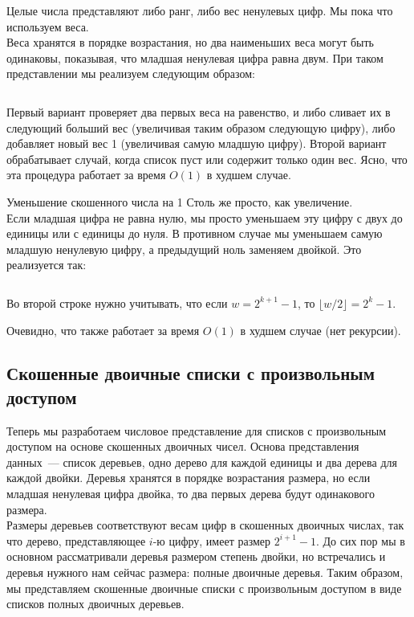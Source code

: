 \begin{frame}[fragile]{}
\inputminted[firstline=3,lastline=3]{haskell}{code/SkewNumbers.hs}
Целые числа представляют либо ранг, либо вес ненулевых цифр. Мы пока
что используем веса. \\

Веса хранятся в порядке возрастания, но два
наименьших веса могут быть одинаковы, показывая, что младшая ненулевая
цифра равна двум. При таком представлении мы реализуем 
следующим образом:
\inputminted[firstline=5,lastline=6]{haskell}{code/SkewNumbers.hs}

Первый вариант проверяет два первых веса на равенство, и либо сливает
их в следующий больший вес (увеличивая таким образом следующую цифру),
либо добавляет новый вес 1 (увеличивая самую младшую цифру). Второй
вариант обрабатывает случай, когда список  пуст или
содержит только один вес. Ясно, что эта процедура работает за время
$O(1)$ в худшем случае.
\end{frame}

\begin{frame}[fragile]{Уменьшение скошенного числа на 1}
Столь же просто, как
увеличение. \\

Если младшая цифра не равна нулю, мы просто уменьшаем эту
цифру с двух до единицы или с единицы до нуля. В противном случае мы
уменьшаем самую младшую ненулевую цифру, а предыдущий ноль заменяем
двойкой. Это реализуется так:
\inputminted[firstline=9,lastline=10]{haskell}{code/SkewNumbers.hs}

Во второй строке нужно учитывать, что если $w = 2^{k+1} - 1$, то
$\lfloor w/2 \rfloor = 2^k - 1$. 

Очевидно, что  также
работает за время $O(1)$ в худшем случае (нет рекурсии).

\end{frame}

\subsection{Скошенные двоичные списки с произвольным доступом}
\label{sc:9.3.1}

\begin{frame}[fragile]{}

Теперь мы разработаем числовое представление для списков с
произвольным доступом на основе скошенных двоичных чисел.  Основа
представления данных~--- список деревьев, одно дерево для каждой
единицы и два дерева для каждой двойки. Деревья хранятся в порядке
возрастания размера, но если младшая ненулевая цифра двойка, то два
первых дерева будут одинакового размера.\\

Размеры деревьев соответствуют весам цифр в скошенных двоичных числах,
так что дерево, представляющее $i$-ю цифру, имеет размер $2^{i+1} -
1$. До сих пор мы в основном рассматривали деревья размером степень
двойки, но встречались и деревья нужного нам сейчас размера: полные
двоичные деревья. Таким образом, мы представляем скошенные двоичные
списки с произвольным доступом в виде списков полных двоичных
деревьев.
\end{frame}

